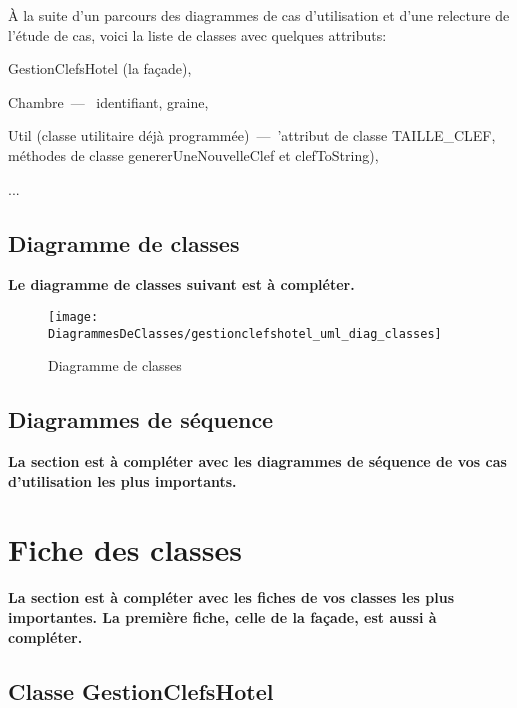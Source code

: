 \documentclass[11pt,article]{article}
\begin{document}
À la suite d'un parcours des diagrammes de cas d'utilisation et d'une
relecture de l'étude de cas, voici la liste de classes avec quelques
attributs:
\begin{compactitem}
\item \textsf{GestionClefsHotel} (la façade),
\item \textsf{Chambre}~---~ identifiant, graine,
\item \textsf{Util} (classe utilitaire déjà programmée)~---~'attribut
  de classe \textsf{TAILLE\_CLEF}, méthodes de classe
  \textsf{genererUneNouvelleClef} et \textsf{clefToString}),
\item ...
\end{compactitem}
\newpage

\subsection{Diagramme de classes}

{\color{red}\textbf{Le diagramme de classes suivant est à compléter.}}

\begin{figure}[h!]
\begin{center}
\texttt{[image: DiagrammesDeClasses/gestionclefshotel\_uml\_diag\_classes]}
\caption{Diagramme de classes}
\end{center}
\label{umlet_diag_classes}
\end{figure}

\newpage

\subsection{Diagrammes de séquence}

{\color{red}\textbf{La section est à compléter avec les diagrammes de séquence de vos cas d'utilisation les plus importants.}}

\newpage

\section{Fiche des classes}

{\color{red}\textbf{La section est à compléter avec les fiches de vos
    classes les plus importantes. La première fiche, celle de la
    façade, est aussi à compléter.}}

\subsection{Classe \textsf{GestionClefsHotel}}
\end{document}
